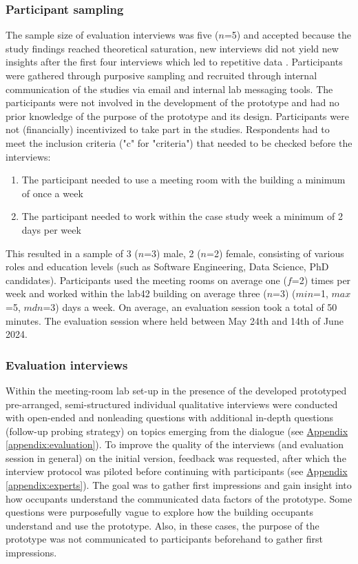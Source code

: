 \subsubsection{Participant sampling}

The sample size of evaluation interviews was five ($n$=5) and accepted because the study findings reached theoretical saturation, new interviews did not yield new insights after the first four interviews which led to repetitive data \cite{steph_menken_introduction_2016}. Participants were gathered through purposive sampling and recruited through internal communication of the studies via email and internal lab messaging tools. The participants were not involved in the development of the prototype and had no prior knowledge of the purpose of the prototype and its design. Participants were not (financially) incentivized to take part in the studies. Respondents had to meet the inclusion criteria ("c" for "criteria") that needed to be checked before the interviews: 

\begin{enumerate}
    \renewcommand{\labelenumi}{C\arabic{enumi}:}
    \item The participant needed to use a meeting room with the building a minimum of once a week
    \item The participant needed to work within the case study week a minimum of 2 days per week
\end{enumerate}

This resulted in a sample of 3 ($n$=3) male, 2 ($n$=2) female, consisting of various roles and education levels (such as Software Engineering, Data Science, PhD candidates). Participants used the meeting rooms on average one ($f$=2) times per week and worked within the lab42 building on average three ($n$=3) ($min$=1, $max$=5, $mdn$=3) days a week. On average, an evaluation session took a total of 50 minutes. The evaluation session where held between May 24th and 14th of June 2024. 

\subsubsection{Evaluation interviews}

Within the meeting-room lab set-up in the presence of the developed prototyped pre-arranged, semi-structured individual qualitative interviews were conducted with open-ended and nonleading questions with additional in-depth questions (follow-up probing strategy) on topics emerging from the dialogue (see \hyperref[appendix:evaluation]{Appendix \ref*{appendix:evaluation}}). To improve the quality of the interviews (and evaluation session in general) on the initial version, feedback was requested, after which the interview protocol was piloted before continuing with participants (see \hyperref[appendix:experts]{Appendix \ref*{appendix:experts}}). The goal was to gather first impressions and gain insight into how occupants understand the communicated data factors of the prototype. Some questions were purposefully vague to explore how the building occupants understand and use the prototype. Also, in these cases, the purpose of the prototype was not communicated to participants beforehand to gather first impressions. 

